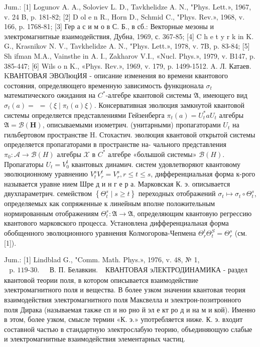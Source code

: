 \documentclass[10pt]{article}
\begin{document}
Jum.: [1] Logunov A. A., Soloviev L. D., Tavkhelidze A. N., "Phys. Lett.», 1967, v. 24 B, p. 181-82; [2] D ol e n R., Horn D., Schmid C., "Phys. Rev.», 1968, v. 166, p. 1768-81; [3] Гер а с и м о в С. Б., в сб.: Векторные мезоны и электромагнитные взаимодействия, Дубна, 1969, с. 367-85; [4] C h e t y r k in K. G., Krasnikov N. V., Tavkhelidze A. N., "Phys. Lett.», 1978, v. 7B, p. 83-84; [5] Sh ifman M.A., Vainsthe in A. I., Zakharov V.I., «Nucl. Phys.», 1979, v. B147, p. 385-447; [6] Wils o n K., «Phys. Rev.», 1969, v. 179, p. 1499-1512. A. Л. Катаев. KВАНТОВАЯ ЭВОЛюцИЯ - описание изменения во времени квантового состояния, определяющего временную зависимость функционала $\sigma_{t}$ математического ожидания на $C^{*}$-алгебре квантовой системы $\mathfrak{A}$, имеющего вид $\sigma_{t}(a)=$ $=\left\langle\xi \mid \pi_{t}(a) \xi\right\rangle$. Консервативная эволюция замкнутой квантовой системы определяется представлениями Гейзенберга $\pi_{t}(a)=U_{t}^{*} a U_{t}$ алгебры $\mathfrak{A}=\mathscr{B}(\boldsymbol{H})$, описываемыми изометрич. (унитарными) пропагаторами $U_{t}$ на гильбертовом пространстве H. Стохастич. эволюция квантовой открытой системы определяется пропагаторами в пространстве на- чального представления $\pi_{0}: \mathfrak{\mathscr { A }} \rightarrow \mathscr{B}(H)$ алгебры $\mathscr{\mathscr { X }}$ в $C^{*}$ алгебре «болышой системы» $\mathscr{B}(H)$. Пропагаторы $U_{t}=V_{0}^{t}$ квантовых динамич. систем удовлетворяют квантовому эволюционному уравнению $V_{t}^{s} V_{r}^{t}=V_{r}^{s}, r \leqslant t \leqslant s$, дифференциальная форма к-рого называется уравне нием Шре д и н г е р а. Марковская К. э. описывается двухпараметрич. семейством $\left\{\Theta_{t}^{s} \mid s \geqslant t\right\}$ переходных отображений $\sigma_{t} \mapsto \sigma_{t} \circ \Theta_{t}^{s}$, определяемых как сопряженные к линейным вполне положительным нормированным отображениям $\Theta_{t}^{s}: \mathfrak{A} \rightarrow \mathfrak{A}$, определяющим квантовую регрессию квантового марковского процесса. Установлена дифференциальная форма обобщенного эволюционного уравнения Колмогорова-Чепмена $\Theta_{r}^{t} \Theta_{t}^{S}=\Theta_{r}^{s}$ (см. [1]).



Jum.: [1] Lindblad G., "Comm. Math. Phys.», 1976, v. 48, № 1, $\begin{array}{ll}\text { p. 119-30. } & \text { В. П. Белавкин. }\end{array}$ КВАНТОВАЯ эЛЕКТРОДИНАМИКА - раздел квантовой теории поля, в котором описывается взаимодействие электромагнитного поля и вещества. В более узком значении квантовая теория взаимодействия электромагнитного поля Максвелла и электрон-позитронного поля Дирака (называемая также сп и но рно й эл е кт ро д и на м и кой). Именно в этом, более узком, смысле термин «К. э.» употребляется ниже. К. э. входит составной частью в стандартную электрослабую теорию, объединяющую слабые и электромагнитные взаимодействия элементарных частиц.
\end{document}
